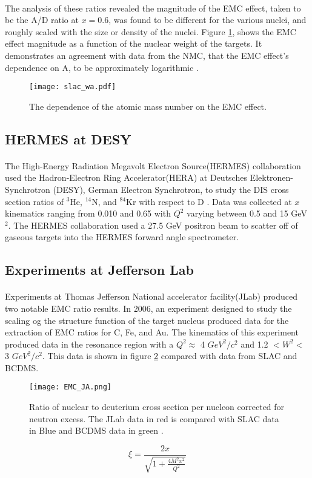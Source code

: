 \paragraph{} The analysis of these ratios revealed the magnitude of the EMC effect, taken to be the A/D ratio at $x=0.6$, was found to be different for the various nuclei, and roughly scaled with the size or density of the nuclei. Figure \ref{gomez_wa}, shows the EMC effect magnitude as a function of the nuclear weight of the targets. It demonstrates an agreement with data from the NMC, that the EMC effect's dependence on A, to be approximately logarithmic \cite{Ajth,gomez,seelyth}. 
\begin{figure}[h]
	\centering
	\caption{The dependence of the atomic mass number on the EMC effect\cite{gomez}.}
	\label{gomez_wa}
	\texttt{[image: slac\_wa.pdf]} 
\end{figure} 
\subsection{HERMES at DESY}
\paragraph{}
The High-Energy Radiation Megavolt Electron Source(HERMES) collaboration used the Hadron-Electron Ring Accelerator(HERA) at Deutsches Elektronen-Synchrotron (DESY), German Electron Synchrotron, to study the DIS cross section ratios of $^3$He, $^{14}$N, and $^{84}$Kr with respect to D \cite{HERMES_EMC}. Data was collected at $x$ kinematics ranging from 0.010 and 0.65 with $Q^2$ varying between 0.5 and 15 GeV$^2$\cite{HERMES_EMC}. The HERMES collaboration used a 27.5 GeV positron beam to scatter off of gaseous targets into the HERMES forward angle spectrometer. 
\subsection{Experiments at Jefferson Lab}
\paragraph{}Experiments at Thomas Jefferson National accelerator facility(JLab) produced two notable EMC ratio results. In 2006, an experiment designed to study the scaling og the structure function of the target nucleus produced data for the extraction of EMC ratios for C, Fe, and Au. The kinematics of this experiment produced data in the resonance region with a $Q^2 \approx$ 4 $GeV^2/c^2$ and 1.2 $ < W^2 < $ 3 $GeV^2/c^2$. This data is shown in figure \ref{fig:EMCJA} compared with data from SLAC and BCDMS. 
\begin{figure}[H]
	\centering
	\texttt{[image: EMC\_JA.png]} 
	\caption{Ratio of nuclear to deuterium cross section per nucleon corrected for neutron excess\cite{EMC_JA}. The JLab data in red is compared with SLAC data in Blue \cite{gomez} and BCDMS data in green \cite{BCDMS}.}
	\label{fig:EMCJA}
\end{figure} 
\begin{equation}
\xi = \frac{2x}{\sqrt{1 + \frac{4M^2x^2}{Q^2}}} \label{xi}
\end{equation}

